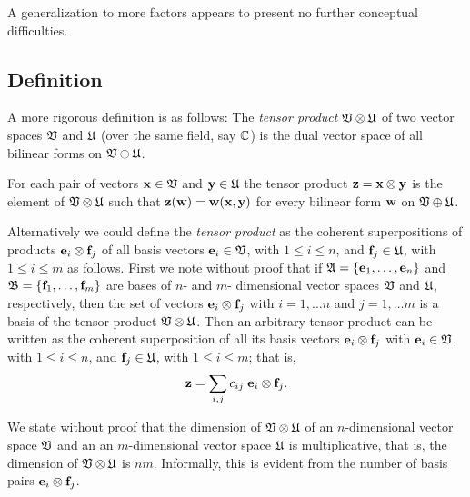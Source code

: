 A generalization to more factors appears to present no further conceptual difficulties.

\subsection{Definition}
A more rigorous definition is as follows:
The {\em tensor product} ${\frak V} \otimes {\frak U}$ of two vector spaces ${\frak V}$
and
${\frak U}$ (over the same field, say ${\Bbb C}$)
is the dual vector space of all bilinear forms on ${\frak V} \oplus {\frak U}$.

For each pair of vectors ${\bf x} \in  {\frak V}$
and
${\bf y} \in  {\frak U}$   the tensor product ${\bf z} = {\bf x} \otimes {\bf y}$
is the element of ${\frak V} \otimes {\frak U}$
such that ${\bf z}({\bf w})={\bf w}({\bf x},{\bf y})$ for every bilinear form
${\bf w}$ on ${\frak V} \oplus {\frak U}$.

Alternatively we could define the {\em tensor product}  as the coherent superpositions of products ${\bf e}_i \otimes {\bf f}_j$
of all basis vectors
${\bf e}_i \in  {\frak V}$, with $1\le i \le n$,
and
${\bf f}_j \in  {\frak U}$, with $1\le i \le m$ as follows.
First we note without proof that if ${\frak A} =\{{\bf e}_1,\ldots , {\bf e}_n\}$ and
${\frak B} =\{{\bf f}_1,\ldots , {\bf f}_m\}$
are bases of  $n$- and $m$-
dimensional vector spaces ${\frak V}$ and  ${\frak U}$, respectively,
then the set
of vectors ${\bf e}_i \otimes {\bf f}_j$
with $i=1,\ldots n$ and $j=1,\ldots m$
 is a basis of the { tensor product}
 ${\frak V} \otimes {\frak U}$.
Then an arbitrary tensor product can be written as the coherent superposition of all
its basis vectors ${\bf e}_i \otimes {\bf f}_j$
with
${\bf e}_i \in  {\frak V}$, with $1\le i \le n$,
and
${\bf f}_j \in  {\frak U}$, with $1\le i \le m$; that is,
\begin{equation}
{\bf z}=\sum_{i,j} c_{ij} \; {\bf e}_i \otimes {\bf f}_j.
\label{2014-m-ch-fdvs-lsqv}
\end{equation}

We state without proof that the dimension
of ${\frak V} \otimes {\frak U}$ of an $n$-dimensional vector space ${\frak V}$
and  an  an $m$-dimensional vector space
${\frak U}$
is multiplicative,
that is, the dimension of  ${\frak V} \otimes {\frak U}$ is $nm$.
Informally, this is evident from the number of basis pairs ${\bf e}_i \otimes {\bf f}_j$.


